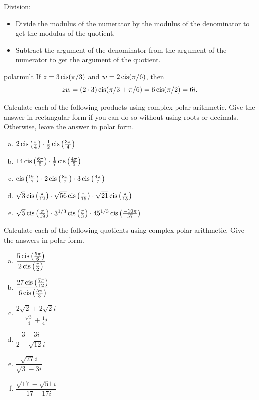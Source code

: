 \medskip{}
\noindent
Division:
\begin{itemize}
\item
Divide the modulus of the numerator by the modulus of the denominator to get the modulus of the quotient.
\item
Subtract the argument of the denominator from the argument of the numerator to get the argument of the quotient.
\end{itemize}

\begin{example}{polarmult} If $z=3\operatorname{cis}(\pi/3)$ and $w=2\operatorname{cis}(\pi/6)$,
then $$zw=(2\cdot3)\operatorname{cis}(\pi/3 + \pi/6)= 6 \operatorname{cis}(\pi/2)=6i.$$ \end{example}

\begin{exercise}{25}
Calculate each of the following products using complex polar arithmetic. Give the answer in rectangular form if you can do so without using roots or decimals. Otherwise, leave the answer in polar form.
\begin{enumerate}[(a)]
 
 \item
$2\operatorname{cis}\left(\frac{\pi}{4}\right) \cdot \frac{1}{2} \operatorname{cis}\left( \frac{3\pi}{4}\right)$
 \item
$14\operatorname{cis}\left( \frac{6\pi}{5}\right) \cdot \frac{1}{7} \operatorname{cis}\left( \frac{4\pi}{5} \right) $
\item
$\operatorname{cis}\left(\frac{9\pi}{7}\right) \cdot 2 \operatorname{cis}\left( \frac{8\pi}{7}\right) \cdot 3 \operatorname{cis}\left( \frac{4\pi}{7}\right)$
\item
$\sqrt{3}\operatorname{cis}\left(\frac{\pi}{12}\right)\cdot \sqrt{56}\operatorname{cis}\left(\frac{\pi}{15}\right)\cdot \sqrt{21}\operatorname{cis}\left(\frac{\pi}{15}\right)$
\item
$\sqrt{5}\operatorname{cis}\left(\frac{\pi}{19}\right)\cdot 3^{1/3} \operatorname{cis}\left(\frac{\pi}{3}\right)\cdot 45^{1/3}\operatorname{cis}\left(\frac{-10\pi}{57}\right)$
\end{enumerate}
\end{exercise}

\begin{exercise}{26}
Calculate each of the following quotients using complex polar arithmetic. Give the answers in polar form.
\begin{multicols}{2}
\begin{enumerate}[(a)]
\item
$\dfrac{5\operatorname{cis}\left( \frac{5\pi}{6}\right)}{2\operatorname{cis} \left( \frac{\pi}{2}\right)}$
\item
$\dfrac{27\operatorname{cis}\left(\frac{7\pi}{12}\right)}{6\operatorname{cis}\left(\frac{5\pi}{3}\right)}$
\item
$\dfrac{2\sqrt{2} + 2\sqrt{2}i}{\frac{\sqrt{3}}{4} + \frac{1}{4}i}$
\item
$\dfrac{3 - 3i}{2 - \sqrt{12}i}$
\item
$\dfrac{\sqrt{27} i}{\sqrt{3} - 3i}$
\item
$\dfrac{\sqrt{17} - \sqrt{51} i}{-17 - 17i}$
 
\end{enumerate}
\end{multicols}
\end{exercise}

